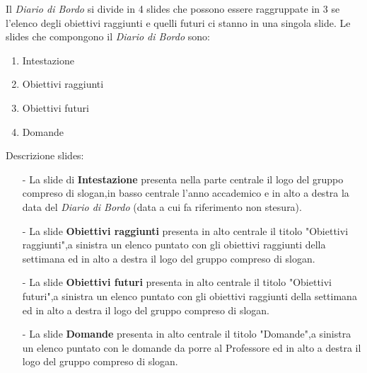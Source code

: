 Il \textit{Diario di Bordo} si divide in 4 slides che possono essere raggruppate in 3 se l'elenco degli obiettivi raggiunti e quelli futuri ci stanno
in una singola slide.
Le slides che compongono il \textit{Diario di Bordo} sono:
\begin{enumerate}
    \item Intestazione 
    \item Obiettivi raggiunti
    \item Obiettivi futuri
    \item Domande 
\end{enumerate}
Descrizione slides:
\begin{itemize}
    \item [-] La slide di \textbf{Intestazione} presenta nella parte centrale il logo del gruppo compreso di slogan,in basso centrale l'anno accademico e in alto a destra la data del 
    \textit{Diario di Bordo} (data a cui fa riferimento non stesura).
    \item [-] La slide \textbf{Obiettivi raggiunti} presenta in alto centrale il titolo "Obiettivi raggiunti",a sinistra un elenco puntato con gli obiettivi raggiunti
    della settimana ed in alto a destra il logo del gruppo compreso di slogan.
    \item [-] La slide \textbf{Obiettivi futuri} presenta in alto centrale il titolo "Obiettivi futuri",a sinistra un elenco puntato con gli obiettivi raggiunti
    della settimana ed in alto a destra il logo del gruppo compreso di slogan.
    \item [-] La slide \textbf{Domande} presenta in alto centrale il titolo "Domande",a sinistra un elenco puntato con le domande da porre al Professore ed in alto a destra il logo del gruppo compreso di slogan.
\end{itemize}